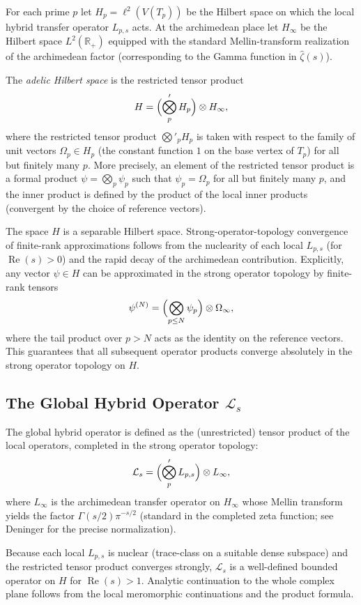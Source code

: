 \documentclass[11pt,a4paper]{amsart}
\begin{document}
For each prime \(p\) let \(H_p = \ell^2(V(T_p))\) be the Hilbert space on which the local hybrid transfer operator \(L_{p,s}\) acts. At the archimedean place let \(H_\infty\) be the Hilbert space \(L^2(\mathbb{R}_+)\) equipped with the standard Mellin-transform realization of the archimedean factor (corresponding to the Gamma function in \(\hat{\zeta}(s)\)). 

The \emph{adelic Hilbert space} is the restricted tensor product
\[
H = \Bigl( \bigotimes'_p H_p \Bigr) \otimes H_\infty,
\]
where the restricted tensor product \(\bigotimes'_p H_p\) is taken with respect to the family of unit vectors \(\Omega_p \in H_p\) (the constant function \(1\) on the base vertex of \(T_p\)) for all but finitely many \(p\). More precisely, an element of the restricted tensor product is a formal product \(\psi = \bigotimes_p \psi_p\) such that \(\psi_p = \Omega_p\) for all but finitely many \(p\), and the inner product is defined by the product of the local inner products (convergent by the choice of reference vectors).

The space \(H\) is a separable Hilbert space. Strong-operator-topology convergence of finite-rank approximations follows from the nuclearity of each local \(L_{p,s}\) (for \(\operatorname{Re}(s)>0\)) and the rapid decay of the archimedean contribution. Explicitly, any vector \(\psi \in H\) can be approximated in the strong operator topology by finite-rank tensors
\[
\psi^{(N)} = \Bigl( \bigotimes_{p\leq N} \psi_p \Bigr) \otimes \Omega_\infty,
\]
where the tail product over \(p>N\) acts as the identity on the reference vectors. This guarantees that all subsequent operator products converge absolutely in the strong operator topology on \(H\).

\subsection{The Global Hybrid Operator \(\mathcal{L}_s\)}

The global hybrid operator is defined as the (unrestricted) tensor product of the local operators, completed in the strong operator topology:
\[
\mathcal{L}_s = \Bigl( \bigotimes'_p L_{p,s} \Bigr) \otimes L_\infty,
\]
where \(L_\infty\) is the archimedean transfer operator on \(H_\infty\) whose Mellin transform yields the factor \(\Gamma(s/2)\pi^{-s/2}\) (standard in the completed zeta function; see Deninger \cite{Deninger1998} for the precise normalization). 

Because each local \(L_{p,s}\) is nuclear (trace-class on a suitable dense subspace) and the restricted tensor product converges strongly, \(\mathcal{L}_s\) is a well-defined bounded operator on \(H\) for \(\operatorname{Re}(s) > 1\). Analytic continuation to the whole complex plane follows from the local meromorphic continuations and the product formula.
\end{document}
